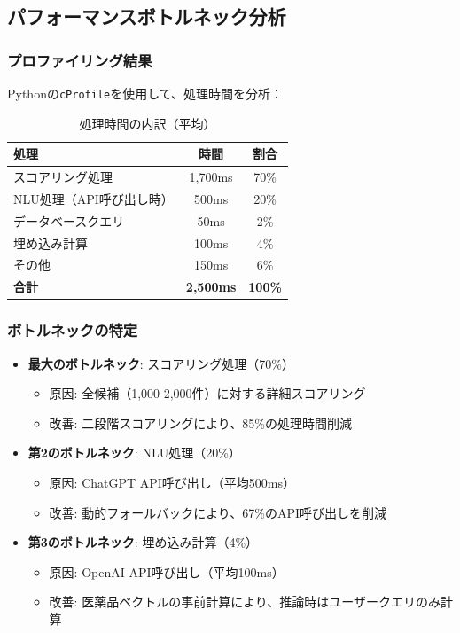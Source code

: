 \documentclass[a4paper,11pt,ja=standard,xelatex]{bxjsarticle}
\theoremstyle{definition}
\begin{document}
\subsection{パフォーマンスボトルネック分析}

\subsubsection{プロファイリング結果}

Pythonの\texttt{cProfile}を使用して、処理時間を分析：

\begin{table}[!htbp]
\centering
\caption{処理時間の内訳（平均）}
\begin{tabular}{|l|c|c|}
\hline
\textbf{処理} & \textbf{時間} & \textbf{割合} \\
\hline
スコアリング処理 & 1,700ms & 70\% \\
NLU処理（API呼び出し時） & 500ms & 20\% \\
データベースクエリ & 50ms & 2\% \\
埋め込み計算 & 100ms & 4\% \\
その他 & 150ms & 6\% \\
\hline
\textbf{合計} & \textbf{2,500ms} & \textbf{100\%} \\
\hline
\end{tabular}
\end{table}

\subsubsection{ボトルネックの特定}

\begin{itemize}
\item \textbf{最大のボトルネック}: スコアリング処理（70\%）
  \begin{itemize}
  \item 原因: 全候補（1,000-2,000件）に対する詳細スコアリング
  \item 改善: 二段階スコアリングにより、85\%の処理時間削減
  \end{itemize}
\item \textbf{第2のボトルネック}: NLU処理（20\%）
  \begin{itemize}
  \item 原因: ChatGPT API呼び出し（平均500ms）
  \item 改善: 動的フォールバックにより、67\%のAPI呼び出しを削減
  \end{itemize}
\item \textbf{第3のボトルネック}: 埋め込み計算（4\%）
  \begin{itemize}
  \item 原因: OpenAI API呼び出し（平均100ms）
  \item 改善: 医薬品ベクトルの事前計算により、推論時はユーザークエリのみ計算
  \end{itemize}
\end{itemize}
\end{document}

